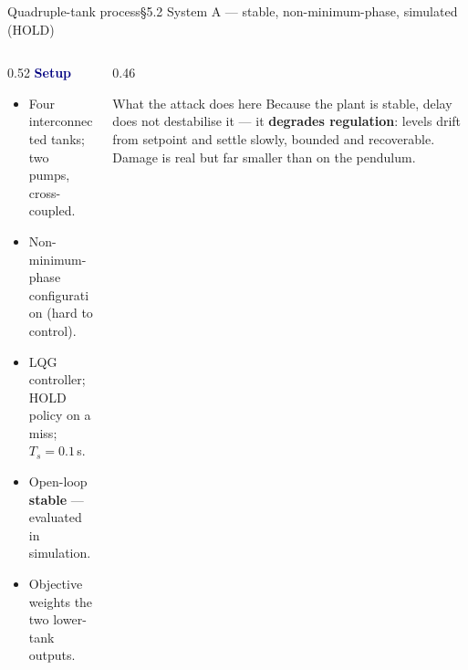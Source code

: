 \documentclass[aspectratio=169,10pt]{beamer}
\begin{document}
\begin{frame}{Quadruple-tank process}{\S5.2 \quad System A --- stable, non-minimum-phase, simulated (HOLD)}
  \begin{columns}[T]
    \begin{column}{0.52\textwidth}
      \textbf{\textcolor{navy}{Setup}}
      \begin{itemize}
        \item Four interconnected tanks; two pumps, cross-coupled.
        \item Non-minimum-phase configuration (hard to control).
        \item LQG controller; HOLD policy on a miss; $T_s = 0.1$\,s.
        \item Open-loop \textbf{stable} --- evaluated in simulation.
        \item Objective weights the two lower-tank outputs.
      \end{itemize}
    \end{column}
    \begin{column}{0.46\textwidth}
      \begin{block}{What the attack does here}
        Because the plant is stable, delay does not destabilise it --- it \textbf{degrades regulation}: levels drift from setpoint and settle slowly, bounded and recoverable. Damage is real but far smaller than on the pendulum.
      \end{block}
    \end{column}
  \end{columns}
\end{frame}
\end{document}
